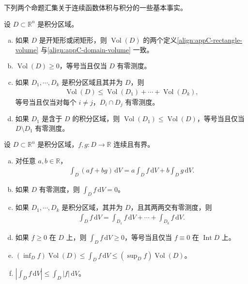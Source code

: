 \documentclass[../../main.tex]{subfiles}
\begin{document}
下列两个命题汇集关于连续函数体积与积分的一些基本事实。

\begin{proposition}[体积的性质]\label{proposition:appC-volume-properties}
设 $D\subset\mathbb R^n$ 是积分区域。
\begin{enumerate}[(a)]
\item 如果 $D$ 是开矩形或闭矩形，则 $\operatorname{Vol}(D)$ 的两个定义\eqref{align:appC-rectangle-volume} 与\eqref{align:appC-domain-volume} 一致。
\item $\operatorname{Vol}(D)\geqslant0$，等号当且仅当 $D$ 有零测度。
\item 如果 $D_1,\cdots ,D_k$ 是积分区域且其并为 $D$，则
\begin{align*}
\operatorname{Vol}(D)\leqslant\operatorname{Vol}(D_1)+\cdots+\operatorname{Vol}(D_k),
\end{align*}
等号当且仅当对每个 $i\neq j$，$D_i\cap D_j$ 有零测度。
\item 如果 $D_1$ 是含于 $D$ 的积分区域，则 $\operatorname{Vol}(D_1)\leqslant\operatorname{Vol}(D)$，等号当且仅当 $D\setminus D_1$ 有零测度。
\end{enumerate}
\end{proposition}

\begin{proposition}[积分的性质]\label{proposition:appC-integral-properties}
设 $D\subset\mathbb R^n$ 是积分区域，$f,g:D\to\mathbb R$ 连续且有界。
\begin{enumerate}[(a)]
\item 对任意 $a,b\in\mathbb R$，
\begin{align*}
\int_D(af+bg)\,\mathrm{d}V=a\int_D f\,\mathrm{d}V+b\int_D g\,\mathrm{d}V.
\end{align*}
\item 如果 $D$ 有零测度，则 $\int_D f\,\mathrm{d}V=0$。
\item 如果 $D_1,\cdots ,D_k$ 是积分区域，其并为 $D$，且其两两交有零测度，则
\begin{align*}
\int_D f\,\mathrm{d}V=\int_{D_1}f\,\mathrm{d}V+\cdots+\int_{D_k}f\,\mathrm{d}V.
\end{align*}
\item 如果 $f\geqslant0$ 在 $D$ 上，则 $\int_D f\,\mathrm{d}V\geqslant0$，等号当且仅当 $f\equiv0$ 在 $\operatorname{Int}D$ 上。
\item $(\inf_D f)\operatorname{Vol}(D)\leqslant\int_D f\,\mathrm{d}V\leqslant(\sup_D f)\operatorname{Vol}(D)$。
\item $\left|\int_D f\,\mathrm{d}V\right|\leqslant\int_D|f|\,\mathrm{d}V$。
\end{enumerate}
\end{proposition}
\end{document}
